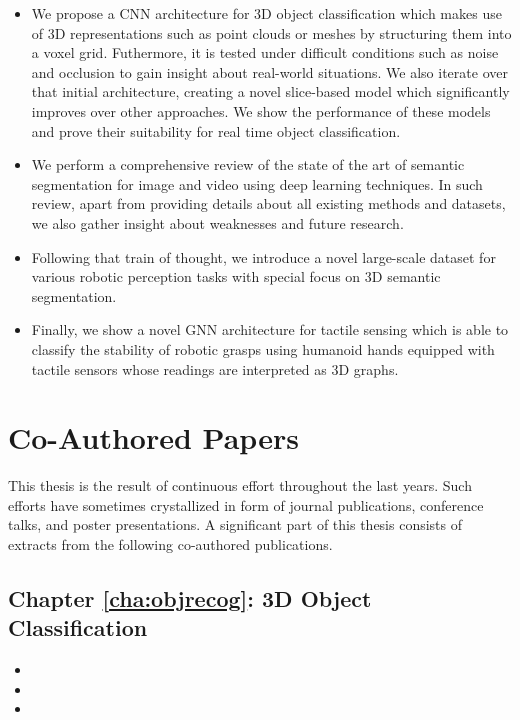 \begin{itemize}
    \item We propose a \acl{CNN} architecture for \acs{3D} object classification which makes use of \acs{3D} representations such as point clouds or meshes by structuring them into a voxel grid. Futhermore, it is tested under difficult conditions such as noise and occlusion to gain insight about real-world situations. We also iterate over that initial architecture, creating a novel slice-based model which significantly improves over other approaches. We show the performance of these models and prove their suitability for real time object classification.
    \item We perform a comprehensive review of the state of the art of semantic segmentation for image and video using deep learning techniques. In such review, apart from providing details about all existing methods and datasets, we also gather insight about weaknesses and future research.
    \item Following that train of thought, we introduce a novel large-scale dataset for various robotic perception tasks with special focus on 3D semantic segmentation.
    \item Finally, we show a novel \acl{GNN} architecture for tactile sensing which is able to classify the stability of robotic grasps using humanoid hands equipped with tactile sensors whose readings are interpreted as \acs{3D} graphs.
\end{itemize}

\section{Co-Authored Papers}
\label{cha:introduction:sec:papers}

This thesis is the result of continuous effort throughout the last years. Such efforts have sometimes crystallized in form of journal publications, conference talks, and poster presentations. A significant part of this thesis consists of extracts from the following co-authored publications.

\subsection{Chapter \ref{cha:objrecog}: 3D Object Classification}

\begin{itemize}
  \item {}
  \item {}
  \item {}
\end{itemize}

